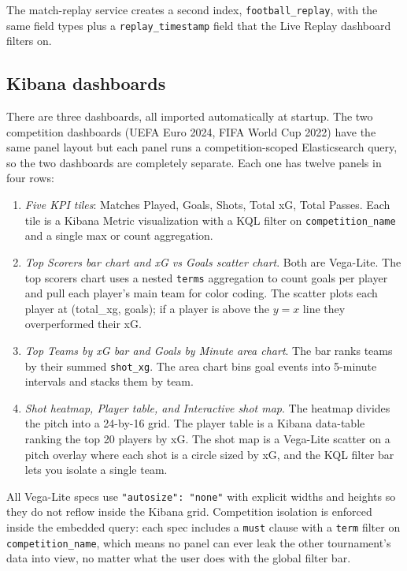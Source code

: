 \documentclass[conference]{IEEEtran}
\begin{document}
The match-replay service creates a second index, \texttt{football\_replay},
with the same field types plus a \texttt{replay\_timestamp} field that the
Live Replay dashboard filters on.

\subsection{Kibana dashboards}

There are three dashboards, all imported automatically at startup. The two
competition dashboards (UEFA Euro 2024, FIFA World Cup 2022) have the same
panel layout but each panel runs a competition-scoped Elasticsearch query, so
the two dashboards are completely separate. Each one has twelve panels in
four rows:

\begin{enumerate}
  \item \textit{Five KPI tiles}: Matches Played, Goals, Shots, Total xG, Total
        Passes. Each tile is a Kibana Metric visualization with a KQL filter
        on \texttt{competition\_name} and a single max or count aggregation.
  \item \textit{Top Scorers bar chart and xG vs Goals scatter chart}. Both are
        Vega-Lite. The top scorers chart uses a nested \texttt{terms}
        aggregation to count goals per player and pull each player's main team
        for color coding. The scatter plots each player at (total\_xg, goals);
        if a player is above the \(y=x\) line they overperformed their xG.
  \item \textit{Top Teams by xG bar and Goals by Minute area chart}. The bar
        ranks teams by their summed \texttt{shot\_xg}. The area chart bins
        goal events into 5-minute intervals and stacks them by team.
  \item \textit{Shot heatmap, Player table, and Interactive shot map}. The
        heatmap divides the pitch into a 24-by-16 grid. The player table is a
        Kibana data-table ranking the top 20 players by xG. The shot map is a
        Vega-Lite scatter on a pitch overlay where each shot is a circle sized
        by xG, and the KQL filter bar lets you isolate a single team.
\end{enumerate}

All Vega-Lite specs use \texttt{"autosize": "none"} with explicit widths and
heights so they do not reflow inside the Kibana grid. Competition isolation
is enforced inside the embedded query: each spec includes a \texttt{must}
clause with a \texttt{term} filter on \texttt{competition\_name}, which means
no panel can ever leak the other tournament's data into view, no matter what
the user does with the global filter bar.
\end{document}
